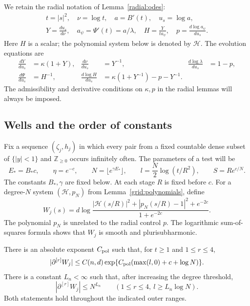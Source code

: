 We retain the radial notation of Lemma~\ref{radial:odes}:
\[
 \begin{gathered}
 t=|s|^2,\quad \nu=\log t,\quad a=B'(t),\quad u_s=\log a,\\
 Y=\frac{du_s}{d\nu},\quad a_\psi=\Psi'(t)=a/\lambda,\quad
 H=\frac{Y}{ta_\psi},\quad p=\frac{d\log a_\psi}{du_s}.
 \end{gathered}
\]
Here $H$ is a scalar; the polynomial system below is denoted by
$\mathcal H$. The evolution equations are
\begin{align}
 \frac{dY}{du_s}&=\kappa(1+Y),&
 \frac{d\nu}{du_s}&=Y^{-1},&
 \frac{d\log\lambda}{du_s}&=1-p,\label{assembly:clocks}\\
 \frac{d\Psi}{du_s}&=H^{-1},&
 \frac{d\log H}{du_s}
 &=\kappa(1+Y^{-1})-p-Y^{-1}.
 \label{assembly:H-clock}
\end{align}
The admissibility and derivative conditions on $\kappa,p$ in the radial
lemmas will always be imposed.

\subsection{Wells and the order of constants}

Fix a sequence $(\zeta_j,h_j)$ in which every pair from a fixed countable
dense subset of $\{|y|<1\}$ and $\mathbb Z_{\geq0}$ occurs infinitely
often. The parameters of a test will be
\begin{equation}\label{assembly:test-parameters}
 E_*=B_*c,\qquad \eta=e^{-c},\qquad
 N=\lfloor e^{\gamma E_*}\rfloor,\qquad
 l=\frac N2\log(t/R^2),\qquad S=Re^{c/N}.
\end{equation}
The constants $B_*,\gamma$ are fixed below. At each stage $R$ is fixed
before $c$. For a degree-$N$ system $(\mathcal H,p_N)$ from
Lemma~\ref{grid:polynomials}, define
\begin{equation}\label{assembly:well}
 W_j(s)=d\log
 \frac{|\mathcal H(s/R)|^2+|p_N(s/R)-1|^2+e^{-2c}}
 {1+e^{-2c}}.
\end{equation}
The polynomial $p_N$ is unrelated to the radial control $p$.
The logarithmic sum-of-squares formula shows that $W_j$ is smooth
and plurisubharmonic.

\begin{lemma}\label{assembly:well-bounds}
There is an absolute exponent $C_{\rm pol}$ such that, for $t\geq1$
and $1\leq r\leq4$,
\begin{equation}\label{assembly:well-raw}
 |\partial^{[r]}W_j|
 \leq C(n,d)\exp\{C_{\rm pol}(\max(l,0)+c+\log N)\}.
\end{equation}
There is a constant $L_n<\infty$ such that, after increasing the degree
threshold,
\begin{equation}\label{assembly:well-tail}
 |\partial^{[r]}W_j|\leq N^{L_n}
 \qquad(1\leq r\leq4,\ l\geq L_n\log N).
\end{equation}
Both statements hold throughout the indicated outer ranges.
\end{lemma}

